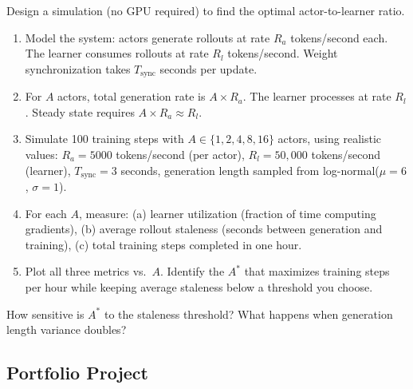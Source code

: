\begin{exercise}
Design a simulation (no GPU required) to find the optimal actor-to-learner ratio.

\begin{enumerate}
  \item Model the system: actors generate rollouts at rate $R_a$ tokens/second each. The learner consumes rollouts at rate $R_l$ tokens/second. Weight synchronization takes $T_{\text{sync}}$ seconds per update.
  \item For $A$ actors, total generation rate is $A \times R_a$. The learner processes at rate $R_l$. Steady state requires $A \times R_a \approx R_l$.
  \item Simulate 100 training steps with $A \in \{1, 2, 4, 8, 16\}$ actors, using realistic values: $R_a = 5000$ tokens/second (per actor), $R_l = 50{,}000$ tokens/second (learner), $T_{\text{sync}} = 3$ seconds, generation length sampled from log-normal($\mu = 6$, $\sigma = 1$).
  \item For each $A$, measure: (a) learner utilization (fraction of time computing gradients), (b) average rollout staleness (seconds between generation and training), (c) total training steps completed in one hour.
  \item Plot all three metrics vs.\ $A$. Identify the $A^*$ that maximizes training steps per hour while keeping average staleness below a threshold you choose.
\end{enumerate}

How sensitive is $A^*$ to the staleness threshold? What happens when generation length variance doubles?
\end{exercise}

\subsection*{Portfolio Project}

